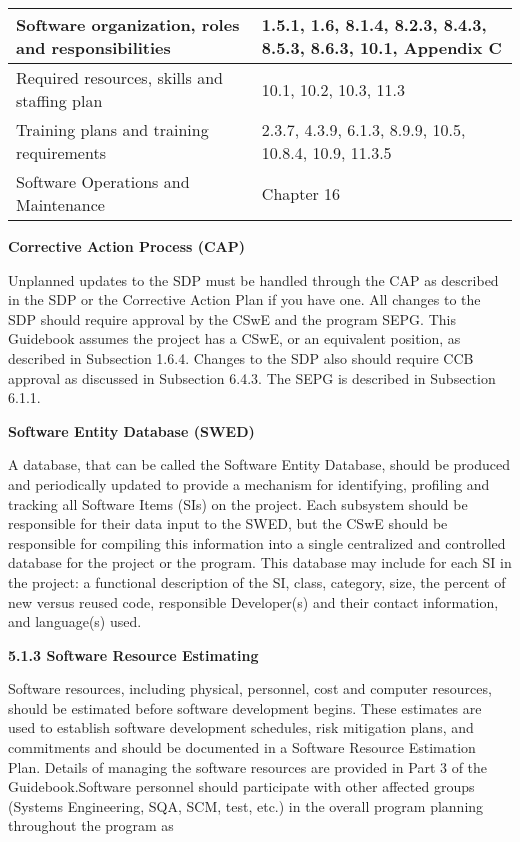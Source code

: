 \documentclass{book}
\begin{document}
\begin{table}
\begin{center}
\begin{tabular}{| m{8cm} | m{8cm} |}
			\hline Software organization, roles and responsibilities & 1.5.1, 1.6, 8.1.4, 8.2.3, 8.4.3, 8.5.3, 8.6.3, 10.1, Appendix C\\
			\hline Required resources, skills and staffing plan & 10.1, 10.2, 10.3, 11.3\\
			\hline Training plans and training requirements & 2.3.7, 4.3.9, 6.1.3, 8.9.9, 10.5, 10.8.4, 10.9, 11.3.5\\
			\hline Software Operations and Maintenance & Chapter 16\\
			\hline
		\end{tabular}
		\end{center}
	\end{table}
	\begin{multicols}{2}
		\textbf{Corrective Action Process (CAP)}
		
		Unplanned updates to the SDP must be handled through the CAP as described
		in the SDP or the Corrective Action Plan if you have one. All changes to the SDP should require approval by the CSwE
		and the program SEPG. This Guidebook assumes the project has a CSwE, or an equivalent position, as described in
		Subsection 1.6.4. Changes to the SDP also should require CCB approval as discussed in Subsection 6.4.3. The SEPG is
		described in Subsection 6.1.1.
		
		\textbf{Software Entity Database (SWED)}
		
		A database, that can be called the Software Entity Database, should be produced and periodically updated to provide a mechanism for identifying, profiling and tracking all Software Items (SIs) on
		the project. Each subsystem should be responsible for their data input to the SWED, but the CSwE should be responsible for compiling this information into a single centralized and controlled database for the project or the program. This database may include for each SI in the project: a functional description of the SI, class, category, size, the percent of new
		versus reused code, responsible Developer(s) and their contact information, and language(s) used.
		
		\textbf{5.1.3 Software Resource Estimating} 
		
		Software resources, including physical, personnel, cost and computer resources, should be estimated before software
		development begins. These estimates are used to establish software development schedules, risk mitigation plans, and
		commitments and should be documented in a Software Resource Estimation Plan. Details of managing the software
		resources are provided in Part 3 of the Guidebook.Software personnel should participate with other affected
		groups (Systems Engineering, SQA, SCM, test, etc.) in the overall program planning throughout the program as  %


\end{multicols}
\end{document}
